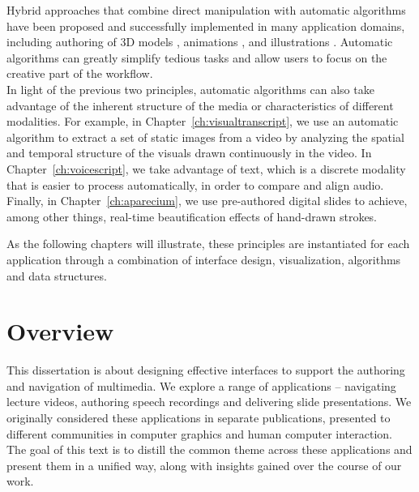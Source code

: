 \begin{mldescription}
 Hybrid approaches that combine direct manipulation with automatic algorithms have been proposed and successfully implemented in many application domains, including authoring of 3D models \cite{gal2009iwires, prevost2013make}, animations \cite{bai2016artist}, and illustrations \cite{chi2012mixt}. Automatic algorithms can greatly simplify tedious tasks and allow users to focus on the creative part of the workflow.\\
In light of the previous two principles, automatic algorithms can also take advantage of the inherent structure of the media or characteristics of different modalities. For example, in Chapter~\ref{ch:visualtranscript}, we use an automatic algorithm to extract  a set of static images from a video by analyzing the spatial and temporal structure of the visuals drawn continuously in the video. In Chapter~\ref{ch:voicescript}, we take advantage of text, which is a discrete modality that is easier to process automatically, in order to compare and align audio. Finally, in Chapter~\ref{ch:aparecium}, we use pre-authored digital slides to achieve, among other things, real-time beautification effects of hand-drawn strokes.\\ 
\end{mldescription}

As the following chapters will illustrate, these principles are instantiated for each application through a combination of interface design, visualization, algorithms and data structures.

\section{Overview}
This dissertation is about designing effective interfaces to support the authoring and navigation of multimedia. We explore a range of applications -- navigating lecture videos, authoring speech recordings and delivering slide presentations. We originally considered these applications in separate publications, presented to different communities in computer graphics and human computer interaction. The goal of this text is to distill the common theme across these applications and present them in a unified way, along with insights gained over the course of our work.\\


